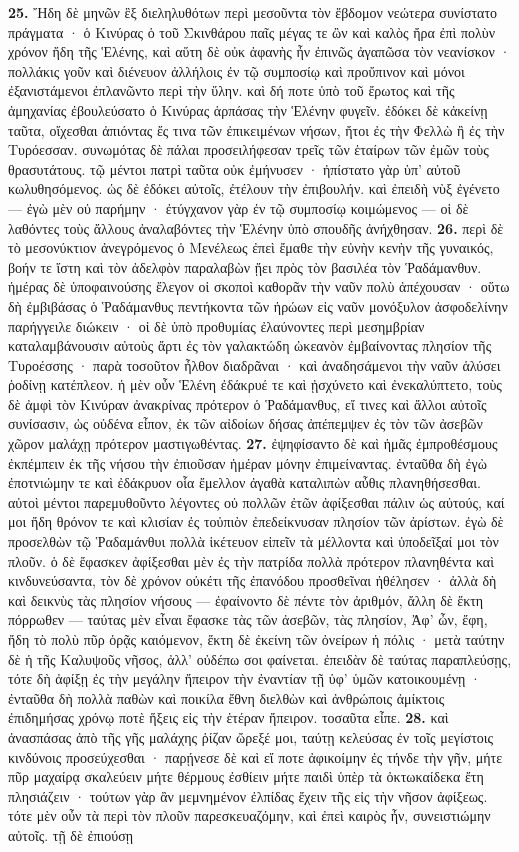 \documentclass[a4paper, 11pt, oneside, polutonikogreek, german]{article}
\begin{document}
\textbf{25.} Ἤδη δὲ μηνῶν ἓξ διεληλυθότων περὶ μεσοῦντα τὸν ἕβδομον νεώτερα συνίστατο πράγματα · ὁ Κινύρας ὁ τοῦ Σκινθάρου παῖς μέγας τε ὢν καὶ καλὸς ἤρα ἐπὶ πολὺν χρόνον ἤδη τῆς Ἑλένης, καὶ αὕτη δὲ οὐκ ἀφανὴς ἦν ἐπινῶς ἀγαπῶσα τὸν νεανίσκον · πολλάκις γοῦν καὶ διένευον ἀλλήλοις ἐν τῷ συμποσίῳ καὶ προὔπινον καὶ μόνοι ἐξανιστάμενοι ἐπλανῶντο περὶ τὴν ὕλην. καὶ δή ποτε ὑπὸ τοῦ ἔρωτος καὶ τῆς ἀμηχανίας ἐβουλεύσατο ὁ Κινύρας ἁρπάσας τὴν Ἑλένην φυγεῖν. ἐδόκει δὲ κἀκείνῃ ταῦτα, οἴχεσθαι ἀπιόντας ἔς τινα τῶν ἐπικειμένων νήσων, ἤτοι ἐς τὴν Φελλὼ ἢ ἐς τὴν Τυρόεσσαν. συνωμότας δὲ πάλαι προσειλήφεσαν τρεῖς τῶν ἑταίρων τῶν ἐμῶν τοὺς θρασυτάτους. τῷ μέντοι πατρὶ ταῦτα οὐκ ἐμήνυσεν · ἠπίστατο γὰρ ὑπ' αὐτοῦ κωλυθησόμενος. ὡς δὲ ἐδόκει αὐτοῖς, ἐτέλουν τὴν ἐπιβουλήν. καὶ ἐπειδὴ νὺξ ἐγένετο --- ἐγὼ μὲν οὐ παρήμην · ἐτύγχανον γὰρ ἐν τῷ συμποσίῳ κοιμώμενος --- οἱ δὲ λαθόντες τοὺς ἄλλους ἀναλαβόντες τὴν Ἑλένην ὑπὸ σπουδῆς ἀνήχθησαν. \textbf{26.} περὶ δὲ τὸ μεσονύκτιον ἀνεγρόμενος ὁ Μενέλεως ἐπεὶ ἔμαθε τὴν εὐνὴν κενὴν τῆς γυναικός, βοήν τε ἵστη καὶ τὸν ἀδελφὸν παραλαβὼν ᾔει πρὸς τὸν βασιλέα τὸν Ῥαδάμανθυν. ἡμέρας δὲ ὑποφαινούσης ἔλεγον οἱ σκοποὶ καθορᾶν τὴν ναῦν πολὺ ἀπέχουσαν · οὕτω δὴ ἐμβιβάσας ὁ Ῥαδάμανθυς πεντήκοντα τῶν ἡρώων εἰς ναῦν μονόξυλον ἀσφοδελίνην παρήγγειλε διώκειν · οἱ δὲ ὑπὸ προθυμίας ἐλαύνοντες περὶ μεσημβρίαν καταλαμβάνουσιν αὐτοὺς ἄρτι ἐς τὸν γαλακτώδη ὠκεανὸν ἐμβαίνοντας πλησίον τῆς Τυροέσσης · παρὰ τοσοῦτον ἦλθον διαδρᾶναι · καὶ ἀναδησάμενοι τὴν ναῦν ἁλύσει ῥοδίνῃ κατέπλεον. ἡ μὲν οὖν Ἑλένη ἐδάκρυέ τε καὶ ᾐσχύνετο καὶ ἐνεκαλύπτετο, τοὺς δὲ ἀμφὶ τὸν Κινύραν ἀνακρίνας πρότερον ὁ Ῥαδάμανθυς, εἴ τινες καὶ ἄλλοι αὐτοῖς συνίσασιν, ὡς οὐδένα εἶπον, ἐκ τῶν αἰδοίων δήσας ἀπέπεμψεν ἐς τὸν τῶν ἀσεβῶν χῶρον μαλάχῃ πρότερον μαστιγωθέντας. \textbf{27.} ἐψηφίσαντο δὲ καὶ ἡμᾶς ἐμπροθέσμους ἐκπέμπειν ἐκ τῆς νήσου τὴν ἐπιοῦσαν ἡμέραν μόνην ἐπιμείναντας. ἐνταῦθα δὴ ἐγὼ ἐποτνιώμην τε καὶ ἐδάκρυον οἷα ἔμελλον ἀγαθὰ καταλιπὼν αὖθις πλανηθήσεσθαι. αὐτοὶ μέντοι παρεμυθοῦντο λέγοντες οὐ πολλῶν ἐτῶν ἀφίξεσθαι πάλιν ὡς αὐτούς, καί μοι ἤδη θρόνον τε καὶ κλισίαν ἐς τοὐπιὸν ἐπεδείκνυσαν πλησίον τῶν ἀρίστων. ἐγὼ δὲ προσελθὼν τῷ Ῥαδαμάνθυι πολλὰ ἱκέτευον εἰπεῖν τὰ μέλλοντα καὶ ὑποδεῖξαί μοι τὸν πλοῦν. ὁ δὲ ἔφασκεν ἀφίξεσθαι μὲν ἐς τὴν πατρίδα πολλὰ πρότερον πλανηθέντα καὶ κινδυνεύσαντα, τὸν δὲ χρόνον οὐκέτι τῆς ἐπανόδου προσθεῖναι ἠθέλησεν · ἀλλὰ δὴ καὶ δεικνὺς τὰς πλησίον νήσους --- ἐφαίνοντο δὲ πέντε τὸν ἀριθμόν, ἄλλη δὲ ἕκτη πόρρωθεν --- ταύτας μὲν εἶναι ἔφασκε τὰς τῶν ἀσεβῶν, τὰς πλησίον, Ἀφ' ὦν, ἔφη, ἤδη τὸ πολὺ πῦρ ὁρᾷς καιόμενον, ἕκτη δὲ ἐκείνη τῶν ὀνείρων ἡ πόλις · μετὰ ταύτην δὲ ἡ τῆς Καλυψοῦς νῆσος, ἀλλ' οὐδέπω σοι φαίνεται. ἐπειδὰν δὲ ταύτας παραπλεύσῃς, τότε δὴ ἀφίξῃ ἐς τὴν μεγάλην ἤπειρον τὴν ἐναντίαν τῇ ὑφ' ὑμῶν κατοικουμένῃ · ἐνταῦθα δὴ πολλὰ παθὼν καὶ ποικίλα ἔθνη διελθὼν καὶ ἀνθρώποις ἀμίκτοις ἐπιδημήσας χρόνῳ ποτὲ ἥξεις εἰς τὴν ἑτέραν ἤπειρον. τοσαῦτα εἶπε. \textbf{28.} καὶ ἀνασπάσας ἀπὸ τῆς γῆς μαλάχης ῥίζαν ὤρεξέ μοι, ταύτῃ κελεύσας ἐν τοῖς μεγίστοις κινδύνοις προσεύχεσθαι · παρῄνεσε δὲ καὶ εἴ ποτε ἀφικοίμην ἐς τήνδε τὴν γῆν, μήτε πῦρ μαχαίρᾳ σκαλεύειν μήτε θέρμους ἐσθίειν μήτε παιδὶ ὑπὲρ τὰ ὀκτωκαίδεκα ἔτη πλησιάζειν · τούτων γὰρ ἂν μεμνημένον ἐλπίδας ἔχειν τῆς εἰς τὴν νῆσον ἀφίξεως. τότε μὲν οὖν τὰ περὶ τὸν πλοῦν παρεσκευαζόμην, καὶ ἐπεὶ καιρὸς ἦν, συνειστιώμην αὐτοῖς. τῇ δὲ ἐπιούσῃ 
\end{document}
